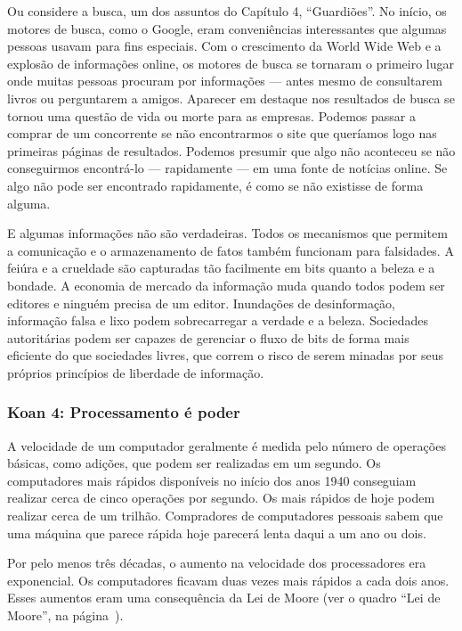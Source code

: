 Ou considere a busca, um dos assuntos do Capítulo 4, ``Guardiões''. No início,
os motores de busca, como o Google, eram conveniências interessantes que algumas
pessoas usavam para fins especiais. Com o crescimento da World Wide Web e a 
explosão de informações online, os motores de busca se tornaram o primeiro lugar 
onde muitas pessoas procuram por informações --- antes mesmo de consultarem
livros ou perguntarem a amigos. Aparecer em destaque nos resultados de busca se
tornou uma questão de vida ou morte para as empresas. Podemos passar a comprar 
de um concorrente se não encontrarmos o site que queríamos logo nas primeiras 
páginas de resultados. Podemos presumir que algo não aconteceu se não 
conseguirmos encontrá-lo --- rapidamente --- em uma fonte de notícias online.
Se algo não pode ser encontrado rapidamente, é como se não existisse de forma
alguma.

E algumas informações não são verdadeiras. Todos os mecanismos que permitem a
comunicação e o armazenamento de fatos também funcionam para falsidades. A 
feiúra e a crueldade são capturadas tão facilmente em bits quanto a beleza e a 
bondade. A economia de mercado da informação muda quando todos podem ser 
editores e ninguém precisa de um editor. Inundações de desinformação, informação 
falsa e lixo podem sobrecarregar a verdade e a beleza. Sociedades autoritárias 
podem ser capazes de gerenciar o fluxo de bits de forma mais eficiente do que 
sociedades livres, que correm o risco de serem minadas por seus próprios 
princípios de liberdade de informação.


\subsubsection*{Koan 4: Processamento é poder}

A velocidade de um computador geralmente é medida pelo número de operações 
básicas, como adições, que podem ser realizadas em um segundo. Os computadores 
mais rápidos disponíveis no início dos anos 1940 conseguiam realizar cerca de 
cinco operações por segundo. Os mais rápidos de hoje podem realizar cerca de um 
trilhão. Compradores de computadores pessoais sabem que uma máquina que parece 
rápida hoje parecerá lenta daqui a um ano ou dois.

Por pelo menos três décadas, o aumento na velocidade dos processadores era 
exponencial. Os computadores ficavam duas vezes mais rápidos a cada dois anos. 
Esses aumentos eram uma consequência da Lei de Moore (ver o quadro ``Lei de
Moore'', na página~\pageref{qd:moore}).

